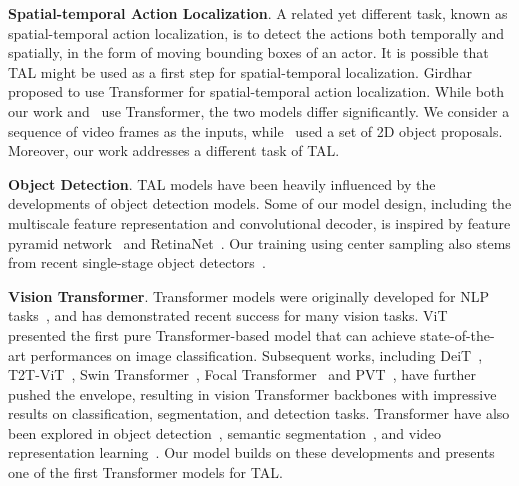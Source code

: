 \noindent \textbf{Spatial-temporal Action Localization}.
A related yet different task, known as spatial-temporal action localization, is to detect the actions both temporally and spatially, in the form of moving bounding boxes of an actor. It is possible that TAL might be used as a first step for spatial-temporal localization. Girdhar \et\ \cite{actiontransformercvpr2019} proposed to use Transformer for spatial-temporal action localization. While both our work and~\cite{actiontransformercvpr2019} use Transformer, the two models differ significantly. We consider a sequence of video frames as the inputs, while~\cite{actiontransformercvpr2019} used a set of 2D object proposals. Moreover, our work addresses a different task of TAL.\smallskip

\noindent \textbf{Object Detection}. TAL models have been heavily influenced by the developments of object detection models. Some of our model design, including the multiscale feature representation and convolutional decoder, is inspired by feature pyramid network~\cite{fpncvpr2017} and RetinaNet~\cite{focaliccv2017}. Our training using center sampling also stems from recent single-stage object detectors~\cite{duan2019centernet,fcosiccv2019,zhang2020bridging}.\smallskip

\noindent \textbf{Vision Transformer}. Transformer models were originally developed for NLP tasks~\cite{transformernips2017}, and has demonstrated recent success for many vision tasks. ViT~\cite{vitarxiv2020} presented the first pure Transformer-based model that can achieve state-of-the-art performances on image classification. Subsequent works, including DeiT~\cite{deiticml2021}, T2T-ViT~\cite{t2tviticcv2021}, Swin Transformer~\cite{swiniccv2021}, Focal Transformer~\cite{yang2021focal} and PVT~\cite{pvticcv2021}, have further pushed the envelope, resulting in vision Transformer backbones with impressive results on classification, segmentation, and detection tasks. Transformer have also been explored in object detection~\cite{detreccv2020,deformabledetriclr2021,dynamicdetriccv2021,pnpiccv2021}, semantic segmentation~\cite{transsegcvpr2021,xie2021segformer,cheng2021per}, and video representation learning~\cite{arnab2021vivit,liu2021video,fan2021multiscale}. Our model builds on these developments and presents one of the first Transformer models for TAL.  
